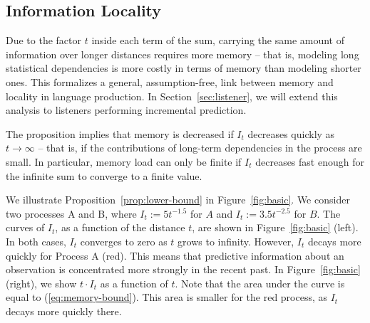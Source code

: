 





\subsection{Information Locality}\label{sec:info-locality}

Due to the factor $t$ inside each term of the sum, carrying the same amount of information over longer distances requires more memory -- that is, modeling long statistical dependencies is more costly in terms of memory than modeling shorter ones.
This formalizes a general, assumption-free, link between memory and locality in language production.
In Section~\ref{sec:listener}, we will extend this analysis to listeners performing incremental prediction.

The proposition implies that memory is decreased if $I_t$ decreases quickly as $t \rightarrow \infty$ -- that is, if the contributions of long-term dependencies in the process are small.
In particular, memory load can only be finite if $I_t$ decreases fast enough for the infinite sum to converge to a finite value.


We illustrate Proposition~\ref{prop:lower-bound} in Figure~\ref{fig:basic}.
We consider two processes A and B, where $I_t := 5t^{-1.5}$ for $A$ and $I_t := 3.5 t^{-2.5}$ for $B$.
The curves of $I_t$, as a function of the distance $t$, are shown in Figure~\ref{fig:basic} (left).
In both cases, $I_t$ converges to zero as $t$ grows to infinity. 
However, $I_t$ decays more quickly for Process A (red).
This means that predictive information about an observation is concentrated more strongly in the recent past.
In Figure~\ref{fig:basic} (right), we show $t\cdot I_t$ as a function of $t$.
Note that the area under the curve is equal to (\ref{eq:memory-bound}).
This area is smaller for the red process, as $I_t$ decays more quickly there.  





